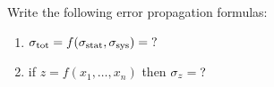 

\vspace*{\fill}
\centering

Write the following error propagation formulas:
\begin{enumerate}
    \item $\sigma_{\rm tot} = f(\sigma_{\rm stat},\sigma_{\rm sys}) = {\rm ?}$ 
    \item if $z = f(x_1,\ldots,x_{n})$ then $\sigma_{z} = {\rm ?}$
\end{enumerate}

\centering
\vspace*{\fill}

